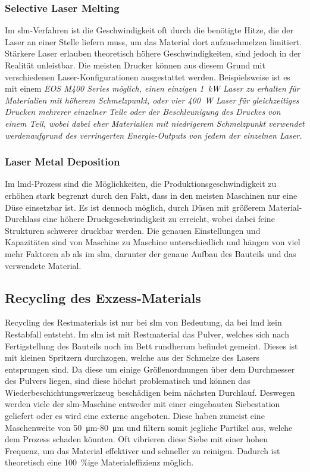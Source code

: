 \documentclass[../main.tex]{subfiles}
\begin{document}
\subsubsection*{Selective Laser Melting}
Im \acrshort{slm}-Verfahren ist die Geschwindigkeit oft durch die benötigte Hitze, die der Laser an einer Stelle liefern muss, um das Material dort aufzuschmelzen limitiert. Stärkere Laser erlauben theoretisch höhere Geschwindigkeiten, sind jedoch in der Realität unleistbar. Die meisten Drucker können aus diesem Grund mit verschiedenen Laser-Konfigurationen ausgestattet werden. Beispielsweise ist es mit einem \it{EOS M400 Series} möglich, einen einzigen \qty{1}{\kilo\watt} Laser zu erhalten für Materialien mit höherem Schmelzpunkt, oder vier \qty{400}{\watt} Laser für gleichzeitiges Drucken mehrerer einzelner Teile oder der Beschleunigung des Druckes von einem Teil, wobei dabei eher Materialien mit niedrigerem Schmelzpunkt verwendet werdenaufgrund des verringerten Energie-Outputs von jedem der einzelnen Laser.\parencite{eosm400,eosm400_4}
\subsubsection*{Laser Metal Deposition}
Im \acrlong{lmd}-Prozess sind die Möglichkeiten, die Produktionsgeschwindigkeit zu erhöhen stark begrenzt durch den Fakt, dass in den meisten Maschinen nur eine Düse einsetzbar ist. Es ist dennoch möglich, durch Düsen mit größerem Material-Durchlass eine höhere Druckgeschwindigkeit zu erreicht, wobei dabei feine Strukturen schwerer druckbar werden. Die genauen Einstellungen und Kapazitäten sind von Maschine zu Maschine unterschiedlich und hängen von viel mehr Faktoren ab als im \acrlong{slm}, darunter der genaue Aufbau des Bauteils und das verwendete Material. \parencite{Mahamood2017}
\subsection{Recycling des Exzess-Materials}
Recycling des Restmaterials ist nur bei \acrshort{slm} von Bedeutung, da bei \acrshort{lmd} kein Restabfall entsteht. Im \acrshort{slm} ist mit Restmaterial das Pulver, welches sich nach Fertigstellung des Bauteils noch im Bett rundherum befindet gemeint. Dieses ist mit kleinen Spritzern durchzogen, welche aus der Schmelze des Lasers entsprungen sind. Da diese um einige Größenordnungen über dem Durchmesser des Pulvers liegen, sind diese höchst problematisch und können das Wiederbeschichtungswerkzeug beschädigen beim nächsten Durchlauf. Deswegen werden viele der \acrshort{slm}-Maschine entweder mit einer eingebauten Siebestation geliefert oder es wird eine externe angeboten. Diese haben zumeist eine Maschenweite von \qty{50}{\micro\meter}-\qty{80}{\micro\meter} und filtern somit jegliche Partikel aus, welche dem Prozess schaden könnten. Oft vibrieren diese Siebe mit einer hohen Frequenz, um das Material effektiver und schneller zu reinigen. Dadurch ist theoretisch eine \qty{100}{\percent}ige Materialeffizienz möglich. 
\end{document}
